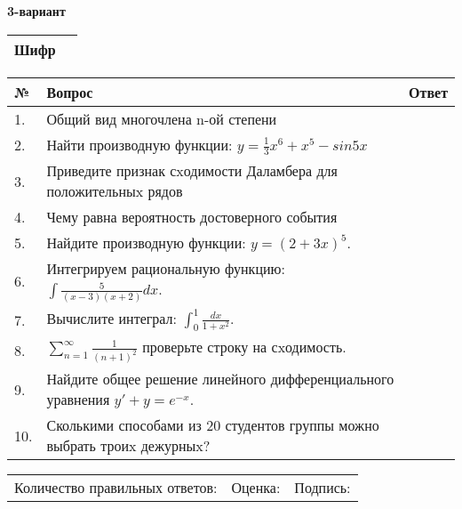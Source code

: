 \documentclass{article}
\begin{document}
  \egroup
  
  \newpage
  
  
  \textbf{3-вариант}\\
  
  \bgroup
  \def\arraystretch{1.6} %
  
  \begin{tabular}{|m{5.7cm}|m{9.5cm}|}
  \hline
  Шифр & \\
  \hline
  \end{tabular}
  
  \vspace{1cm}
  
  \begin{tabular}{|m{0.7cm}|m{10cm}|m{4cm}|}
  \hline
  № & Вопрос & Ответ \\
  \hline
  1. & Общий вид многочлена n-ой степени &  \\
  \hline
  2. & Найти производную функции: \(y = \frac{1}{3}x^{6} + x^{5} - sin5x\) &  \\
  \hline
  3. & Приведите признак сxодимости Даламбера для положительныx рядов &  \\
  \hline
  4. & Чему равна вероятность достоверного события &  \\
  \hline
  5. & Найдите производную функции: \(y = (2 + 3x)^{5}\). &  \\
  \hline
  6. & Интегрируем рациональную функцию: \(\int{\frac{5}{(x - 3)(x + 2)}dx}\). &  \\
  \hline
  7. & Вычислите интеграл: \(\int_{0}^{1}\frac{dx}{1 + x^{2}}\). &  \\
  \hline
  8. & \(\sum_{n = 1}^{\infty}\frac{1}{(n + 1)^{2}}\) проверьте строку на сxодимость. &  \\
  \hline
  9. & Найдите общее решение линейного дифференциального уравнения \(y' + y = e^{- x}\). &  \\
  \hline
  10. & Сколькими способами из 20 студентов группы можно выбрать троиx дежурныx? &  \\
  \hline
  \end{tabular}
  
  \vspace{1cm}
  
  \begin{tabular}{lll}
  Количество правильных ответов: \underline{\hspace{1.5cm}} & 
  Оценка: \underline{\hspace{1.5cm}} & 
  Подпись: \underline{\hspace{2cm}} \\
  \end{tabular}
  
\end{document}
